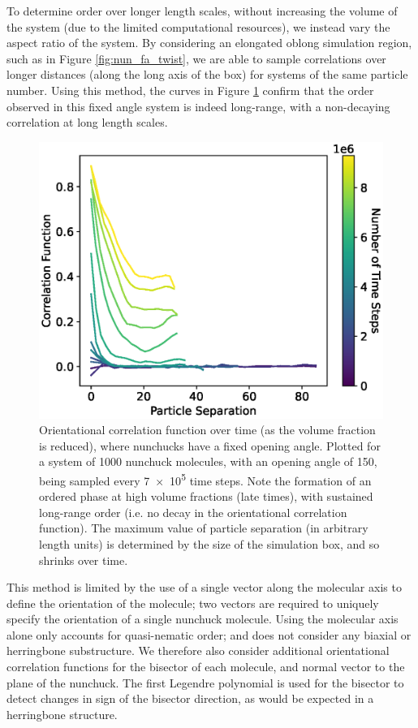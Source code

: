 \documentclass[11pt, a4paper]{article} %
\begin{document}
To determine order over longer length scales, without increasing the volume of the system (due to the limited computational resources), we instead vary the aspect ratio of the system. By considering an elongated oblong simulation region, such as in Figure \ref{fig:nun_fa_twist}, we are able to sample correlations over longer distances (along the long axis of the box) for systems of the same particle number. Using this method, the curves in Figure \ref{fig:num_fa_correlation_mol} confirm that the order observed in this fixed angle system is indeed long-range, with a non-decaying correlation at long length scales.

\begin{figure} [h!]
	\centering
	\includegraphics[width=0.7\linewidth]{Figures/num_fa_correlation_mol}
	\caption{Orientational correlation function over time (as the volume fraction is reduced), where nunchucks have a fixed opening angle. Plotted for a system of \num{1000} nunchuck molecules, with an opening angle of \SI{150}{\deg}, being sampled every \num{7e5} time steps. Note the formation of an ordered phase at high volume fractions (late times), with sustained long-range order (i.e. no decay in the orientational correlation function). The maximum value of particle separation (in arbitrary length units) is determined by the size of the simulation box, and so shrinks over time.}
	\label{fig:num_fa_correlation_mol}
\end{figure}  %


This method is limited by the use of a single vector along the molecular axis to define the orientation of the molecule; two vectors are required to uniquely specify the orientation of a single nunchuck molecule. Using the molecular axis alone only accounts for quasi-nematic order; and does not consider any biaxial or herringbone substructure. We therefore also consider additional orientational correlation functions for the bisector of each molecule, and normal vector to the plane of the nunchuck. The first Legendre polynomial is used for the bisector to detect changes in sign of the bisector direction, as would be expected in a herringbone structure.
\end{document}
